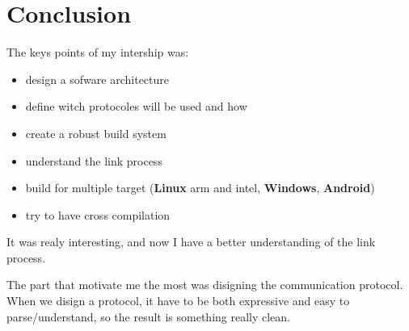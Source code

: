 \documentclass[a4paper,11pt]{custom}
\newcommand{\linux}{\textbf{Linux}}
\newcommand{\win}{\textbf{Windows}}
\newcommand{\android}{\textbf{Android}}
\begin{document}
\chapter{Conclusion}

The keys points of my intership was:
\begin{itemize}
\item design a sofware architecture
\item define witch protocoles will be used and how
\item create a robust build system
\item understand the link process
\item build for multiple target (\linux{} arm and intel, \win, \android)
\item try to have cross compilation
\end{itemize}

It was realy interesting, and now I have a better understanding of the link
process.

The part that motivate me the most was disigning the communication protocol.
When we disign a protocol, it have to be both expressive and easy to
parse/understand, so the result is something really clean.
\end{document}
